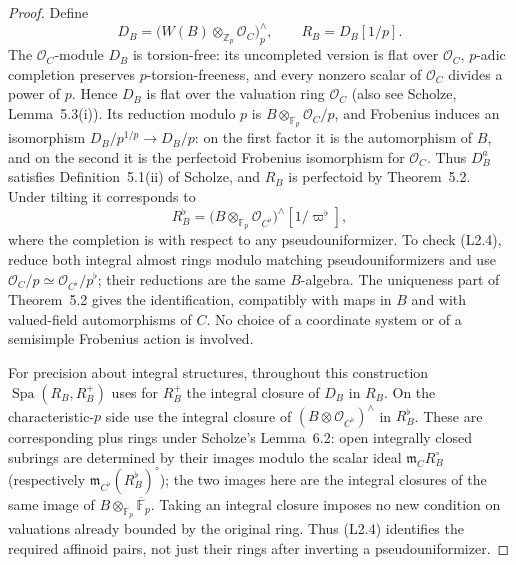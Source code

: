 \begin{proof}
Define
\[
 D_B=\bigl(W(B)\otimes_{\mathbb Z_p}\mathcal O_C\bigr)^{\wedge}_p,
 \qquad R_B=D_B[1/p].
\]
The $\mathcal O_C$-module $D_B$ is torsion-free: its uncompleted
version is flat over $\mathcal O_C$, $p$-adic completion preserves
$p$-torsion-freeness, and every nonzero scalar of $\mathcal O_C$
divides a power of $p$.  Hence $D_B$ is flat over the valuation ring
$\mathcal O_C$ (also see Scholze, Lemma~5.3(i)).  Its reduction modulo
$p$ is $B\otimes_{\mathbb F_p}\mathcal O_C/p$, and Frobenius induces
an isomorphism $D_B/p^{1/p}\longrightarrow D_B/p$: on the first
factor it is the automorphism of $B$, and on the second it is the
perfectoid Frobenius isomorphism for $\mathcal O_C$.  Thus $D_B^a$
satisfies Definition~5.1(ii) of Scholze, and $R_B$ is perfectoid by
Theorem~5.2.  Under tilting it corresponds to
\[
 R_B^\flat=
 \bigl(B\otimes_{\mathbb F_p}\mathcal O_{C^\flat}\bigr)^{\wedge}[1/\varpi^\flat],
 \tag{L2.4}
\]
where the completion is with respect to any pseudouniformizer.  To
check (L2.4), reduce both integral almost rings modulo matching
pseudouniformizers and use
$\mathcal O_C/p\simeq\mathcal O_{C^\flat}/p^\flat$; their reductions
are the same $B$-algebra.  The uniqueness part of Theorem~5.2 gives
the identification, compatibly with maps in $B$ and with valued-field
automorphisms of $C$.  No choice of a coordinate system or of a
semisimple Frobenius action is involved.

For precision about integral structures, throughout this construction
$\operatorname{Spa}(R_B,R_B^+)$ uses for $R_B^+$ the integral closure
of $D_B$ in $R_B$.  On the characteristic-$p$ side use the integral
closure of $(B\otimes\mathcal O_{C^\flat})^{\wedge}$ in $R_B^\flat$.
These are corresponding plus rings under Scholze's Lemma~6.2: open
integrally closed subrings are determined by their images modulo
the scalar ideal $\mathfrak m_C R_B^\circ$ (respectively
$\mathfrak m_{C^\flat}(R_B^\flat)^\circ$); the two images here
are the integral closures of the same image of
$B\otimes_{\mathbb F_p}\overline{\mathbb F}_p$.  Taking an integral
closure imposes no new condition on valuations already bounded by
the original ring.  Thus (L2.4) identifies the required affinoid
pairs, not just their rings after inverting a pseudouniformizer.


\end{proof}
